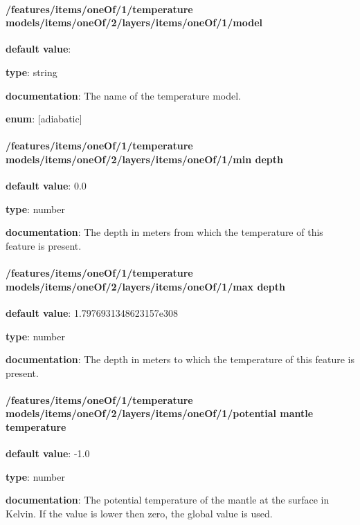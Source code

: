 \paragraph{/features/items/oneOf/1/temperature models/items/oneOf/2/layers/items/oneOf/1/model} \begin{itemized}
\item {\bf default value}: 
\item {\bf type}: string
\item {\bf documentation}: The name of the temperature model.
\item {\bf enum}: [adiabatic]\end{itemized}\paragraph{/features/items/oneOf/1/temperature models/items/oneOf/2/layers/items/oneOf/1/min depth} \begin{itemized}
\item {\bf default value}: 0.0
\item {\bf type}: number
\item {\bf documentation}: The depth in meters from which the temperature of this feature is present.
\end{itemized}\paragraph{/features/items/oneOf/1/temperature models/items/oneOf/2/layers/items/oneOf/1/max depth} \begin{itemized}
\item {\bf default value}: 1.7976931348623157e308
\item {\bf type}: number
\item {\bf documentation}: The depth in meters to which the temperature of this feature is present.
\end{itemized}\paragraph{/features/items/oneOf/1/temperature models/items/oneOf/2/layers/items/oneOf/1/potential mantle temperature} \begin{itemized}
\item {\bf default value}: -1.0
\item {\bf type}: number
\item {\bf documentation}: The potential temperature of the mantle at the surface in Kelvin. If the value is lower then zero, the global value is used.

\end{itemized}
